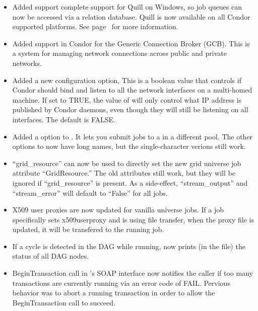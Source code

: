 \begin{itemize}

\item Added support complete support for Quill on Windows, so job queues can
now be accessed via a relation database.  Quill is now available on all Condor
supported platforms.  See page~\pageref{sec:Quill} for more information.

\item Added support in Condor for the Generic Connection Broker
  (GCB).
  This is a system for managing network connections across public and
  private networks.

\item Added a new configuration option, 
  This is a boolean value that controls if Condor should bind and
  listen to all the network interfaces on a multi-homed machine.
  If set to TRUE, the value of  will only
  control what IP address is published by Condor daemons, even though
  they will still be listening on all interfaces.
  The default is FALSE.

\item Added a  option to . It lets you submit
jobs to a  in a different pool. The other options to
 now have long names, but the single-character verions
still work.

\item ``grid\_resource'' can now be used to directly set the new grid
universe job attribute ``GridResource.'' The old attributes still work,
but they will be ignored if ``grid\_resource'' is present. As a
side-effect, ``stream\_output'' and ``stream\_error'' will default to
``False'' for all jobs.

\item X509 user proxies are now updated for vanilla universe jobs.   If
a job specifically sets x509userproxy and is using file transfer, when
the proxy file is updated, it will be transfered to the running job.

\item If a  cycle is detected in the DAG while 
running,  now prints (in the  file)
the status of all DAG nodes.

\item BeginTransaction call in 's SOAP interface now
  notifies the caller if too many transactions are currently running
  via an error code of FAIL. Pervious behavior was to abort a running
  transaction in order to allow the BeginTransaction call to succeed.
  

\end{itemize}
